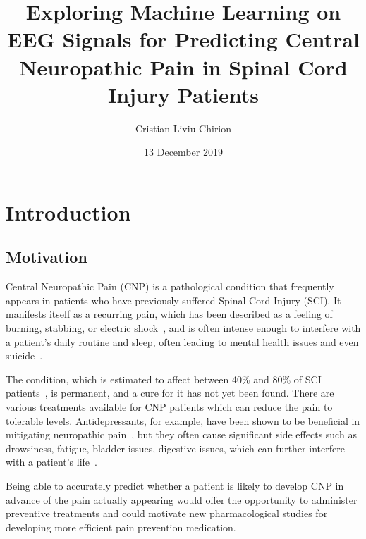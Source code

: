 \documentclass{mprop}
\begin{document}
\title{Exploring Machine Learning on EEG Signals for Predicting Central Neuropathic Pain in Spinal Cord Injury Patients}
\author{Cristian-Liviu Chirion}
\date{13 December 2019}
\maketitle

\educationalconsent
\newpage

\tableofcontents
\newpage

\section{Introduction}\label{intro}

\subsection{Motivation}

Central Neuropathic Pain (CNP) is a pathological condition that frequently appears in patients who have previously suffered Spinal Cord Injury (SCI). It manifests itself as a recurring pain, which has been described as a feeling of burning, stabbing, or electric shock~\cite{hulsebosch_mechanisms_2009}, and is often intense enough to interfere with a patient's daily routine and sleep, often leading to mental health issues and even suicide~\cite{hulsebosch_mechanisms_2009,vuckovic_prediction_2018}.

The condition, which is estimated to affect between 40\% and 80\% of SCI patients~\cite{hulsebosch_mechanisms_2009,vuckovic_prediction_2018}, is permanent, and a cure for it has not yet been found. There are various treatments available for CNP patients which can reduce the pain to tolerable levels. Antidepressants, for example, have been shown to be beneficial in mitigating neuropathic pain~\cite{finnerup_review_2008}, but they often cause significant side effects such as drowsiness, fatigue, bladder issues, digestive issues, which can further interfere with a patient's life~\cite{finnerup_review_2008,khawam_side_2006}.

Being able to accurately predict whether a patient is likely to develop CNP in advance of the pain actually appearing would offer the opportunity to administer preventive treatments and could motivate new pharmacological studies for developing more efficient pain prevention medication.
\end{document}
